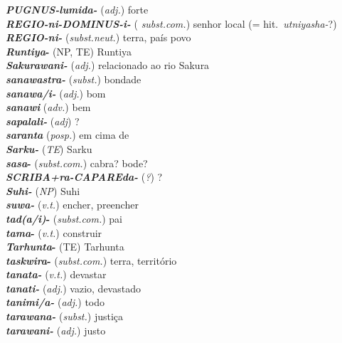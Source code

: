 \begin{multicols}{2}
\begin{hangparas}{1em}{1}
		\textbf{\emph{\emph{PUGNUS}-lumida-}} (\emph{adj.}) \tabto{1em} forte\\
		\textbf{\emph{\emph{REGIO}-ni-\emph{DOMINUS}-i-}} (\emph{ subst.com.}) \tabto{1em} senhor local (= hit.\ \emph{utniyasha-}?)\\
		\textbf{\emph{\emph{REGIO}-ni-}} (\emph{subst.neut.}) \tabto{1em} terra, país  povo\\
		\textbf{\emph{Runtiya}-} (NP, TE) \tabto{1em} Runtiya\\
		\textbf{\emph{Sakurawani-}} (\emph{adj.}) \tabto{1em} relacionado ao rio Sakura\\
		\textbf{\emph{sanawastra-}} (\emph{subst.}) \tabto{1em} bondade\\
		\textbf{\emph{sanawa/i-}} (\emph{adj.}) \tabto{1em} bom\\
		\textbf{\emph{sanawi}} (\emph{adv.}) \tabto{1em} bem\\
		\textbf{\emph{sapalali-}} (\emph{adj}) \tabto{1em} {?}\\
		\textbf{\emph{saranta}} (\emph{posp.}) \tabto{1em} em cima de\\
		\textbf{\emph{Sarku-}} (\emph{TE}) \tabto{1em} Sarku\\
		\textbf{\emph{sasa}-} (\emph{subst.com.}) \tabto{1em} cabra? bode?\\
		\textbf{\emph{\emph{SCRIBA+}ra-\emph{CAPARE}da-}} (\emph{?}) \tabto{1em} {?}\\
		\textbf{\emph{Suhi-}} (\emph{NP}) \tabto{1em} Suhi\\
		\textbf{\emph{suwa-}} (\emph{v.t.}) \tabto{1em} encher, preencher\\
		\textbf{\emph{tad{(a/i)}}-} (\emph{subst.com.}) \tabto{1em} pai\\
		\textbf{\emph{tama}-} (\emph{v.t.}) \tabto{1em} construir\\
		\textbf{\emph{Tarhunta}-} (TE) \tabto{1em} Tarhunta\\
		\textbf{\emph{taskwira}-} (\emph{subst.com.}) \tabto{1em} terra, território\\
		\textbf{\emph{tanata-}} (\emph{v.t.}) \tabto{1em} devastar\\
		\textbf{\emph{tanati-}} (\emph{adj.}) \tabto{1em}  vazio, devastado\\
		\textbf{\emph{tanimi/a-}} (\emph{adj.}) \tabto{1em} todo\\
		\textbf{\emph{tarawana-}} (\emph{subst.}) \tabto{1em} justiça\\
		\textbf{\emph{tarawani-}} (\emph{adj.}) \tabto{1em} justo\\

\end{hangparas}
\end{multicols}
